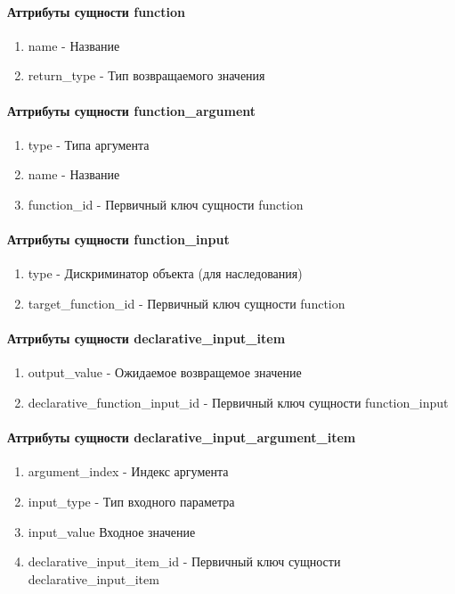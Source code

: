 \documentclass{article}
\begin{document}
\paragraph{Аттрибуты сущности function}
\begin{enumerate}
	\item name - Название
	\item return\_type - Тип возвращаемого значения
\end{enumerate}

\paragraph{Аттрибуты сущности function\_argument}
\begin{enumerate}
	\item type - Типа аргумента
	\item name - Название
	\item function\_id - Первичный ключ сущности
	function
\end{enumerate}

\paragraph{Аттрибуты сущности function\_input}
\begin{enumerate}
	\item type - Дискриминатор объекта (для наследования)
	\item target\_function\_id - Первичный ключ
	сущности function
\end{enumerate}

\paragraph{Аттрибуты сущности declarative\_input\_item}
\begin{enumerate}
	\item output\_value - Ожидаемое возвращемое значение
	\item declarative\_function\_input\_id - Первичный ключ
	сущности function\_input
\end{enumerate}

\paragraph{Аттрибуты сущности declarative\_input\_argument\_item}
\begin{enumerate}
	\item argument\_index - Индекс аргумента
	\item input\_type - Тип входного параметра
	\item input\_value Входное значение
	\item declarative\_input\_item\_id - Первичный ключ сущности
	declarative\_input\_item
\end{enumerate}
\end{document}
